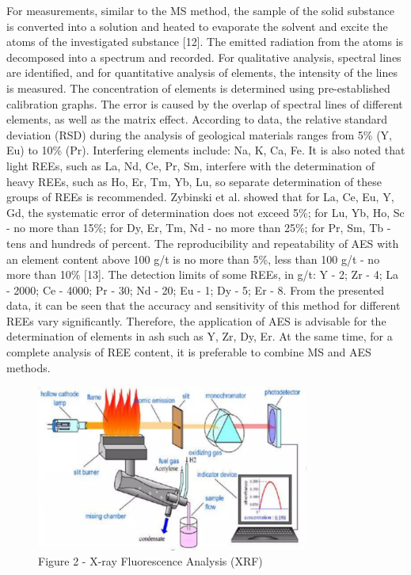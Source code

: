 \begin{multicols}{2}
For measurements, similar to the MS method, the sample of the solid
substance is converted into a solution and heated to evaporate the
solvent and excite the atoms of the investigated substance {[}12{]}. The
emitted radiation from the atoms is decomposed into a spectrum and
recorded. For qualitative analysis, spectral lines are identified, and
for quantitative analysis of elements, the intensity of the lines is
measured. The concentration of elements is determined using
pre-established calibration graphs. The error is caused by the overlap
of spectral lines of different elements, as well as the matrix effect.
According to data, the relative standard deviation (RSD) during the
analysis of geological materials ranges from 5\% (Y, Eu) to 10\% (Pr).
Interfering elements include: Na, K, Ca, Fe. It is also noted that light
REEs, such as La, Nd, Ce, Pr, Sm, interfere with the determination of
heavy REEs, such as Ho, Er, Tm, Yb, Lu, so separate determination of
these groups of REEs is recommended. Zybinski et al. showed that for La,
Ce, Eu, Y, Gd, the systematic error of determination does not exceed
5\%; for Lu, Yb, Ho, Sc - no more than 15\%; for Dy, Er, Tm, Nd - no
more than 25\%; for Pr, Sm, Tb - tens and hundreds of percent. The
reproducibility and repeatability of AES with an element content above
100 g/t is no more than 5\%, less than 100 g/t - no more than 10\%
{[}13{]}. The detection limits of some REEs, in g/t: Y - 2; Zr - 4; La -
2000; Ce - 4000; Pr - 30; Nd - 20; Eu - 1; Dy - 5; Er - 8. From the
presented data, it can be seen that the accuracy and sensitivity of this
method for different REEs vary significantly. Therefore, the application
of AES is advisable for the determination of elements in ash such as Y,
Zr, Dy, Er. At the same time, for a complete analysis of REE content, it
is preferable to combine MS and AES methods.
\end{multicols}

\begin{figure}[H]
	\centering
	\includegraphics[width=0.8\textwidth]{assets/1050}
	\caption*{Figure 2 - X-ray Fluorescence Analysis (XRF)}
\end{figure}

